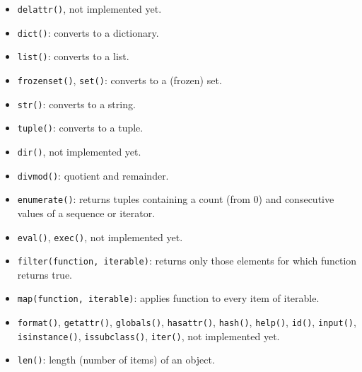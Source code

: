 \begin{itemize}
\item
\texttt{delattr()},
\dotfill not implemented yet.
%

\item \texttt{dict()}: converts to a dictionary.

\item \texttt{list()}: converts to a list.

\item \texttt{frozenset()}, \texttt{set()}: converts to a (frozen) set.

\item \texttt{str()}: converts to a string.

\item \texttt{tuple()}: converts to a tuple.
%

\item
\texttt{dir()},
\dotfill not implemented yet.

\item \texttt{divmod()}: quotient and remainder.

\item \texttt{enumerate()}: returns tuples containing a count (from 0) and consecutive values of a sequence or iterator.

\item
\texttt{eval()},
\texttt{exec()},
\dotfill not implemented yet.

\item \texttt{filter(function, iterable)}: returns only those elements for which function returns true.

\item \texttt{map(function, iterable)}: applies function to every item of iterable.

\item
\texttt{format()},
\texttt{getattr()},
\texttt{globals()},
\texttt{hasattr()},
\texttt{hash()},
\texttt{help()},
\texttt{id()},
\texttt{input()},
\texttt{isinstance()},
\texttt{issubclass()},
\texttt{iter()},
\dotfill not implemented yet.

\item \texttt{len()}: length (number of items) of an object.


\end{itemize}
